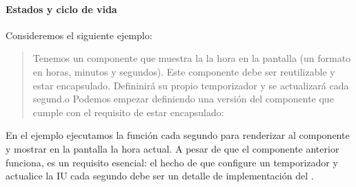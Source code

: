 \paragraph{Estados y ciclo de vida}
\label{\detokenize{reactjs:estados-y-ciclo-de-vida}}
Consideremos el siguiente ejemplo:
\begin{quote}

Tenemos un componente que muestra la la hora en la pantalla (un formato en
horas, minutos y segundos). Este componente debe ser reutilizable y estar
encapsulado. Defininirá su propio temporizador y se actualizará cada segund.o
Podemos empezar definiendo una versión del componente que cumple con el
requisito de estar encapsulado:

%
\begin{sphinxVerbatim}[commandchars=\\\{\}]
  
   

  
      

 
\end{sphinxVerbatim}
\end{quote}

En el ejemplo ejecutamos la función  cada segundo para renderizar al
componente  y mostrar en la pantalla la hora actual. A pesar de
que el componente anterior funciona, es un requisito esencial: el hecho
de que  configure un temporizador y actualice la IU cada segundo
debe ser un detalle de implementación del .

